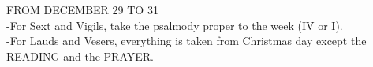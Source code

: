 \begin{center}\normalsize FROM DECEMBER 29 TO 31\\
\footnotesize -For Sext and Vigils, take the psalmody proper to the week (IV or I).\\
\footnotesize -For Lauds and Vesers, everything is taken from Christmas day except the READING and the PRAYER.\\
\end{center}

